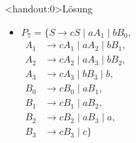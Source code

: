 {
\begin{frame}<handout:0>{Lösung}
        \begin{itemize}
            \item 
                \alert<1>{
                $P_7 = \{S \to cS \mid aA_1 \mid bB_0,$\\
                \vspace*{0.9mm}
                \hspace*{7mm}
                $\begin{aligned}
                A_1 &\to cA_1 \mid aA_2 \mid bB_1,\\
                A_2 &\to cA_2 \mid aA_3 \mid bB_2,\\
                A_3 &\to cA_3 \mid bB_3 \mid b,\\
                B_0 &\to cB_0 \mid aB_1,\\
                B_1 &\to cB_1 \mid aB_2,\\
                B_2 &\to cB_2 \mid aB_3 \mid a,\\
                B_3 &\to cB_3 \mid c\}
                \end{aligned}
                $}
        \end{itemize}
\end{frame}
}
